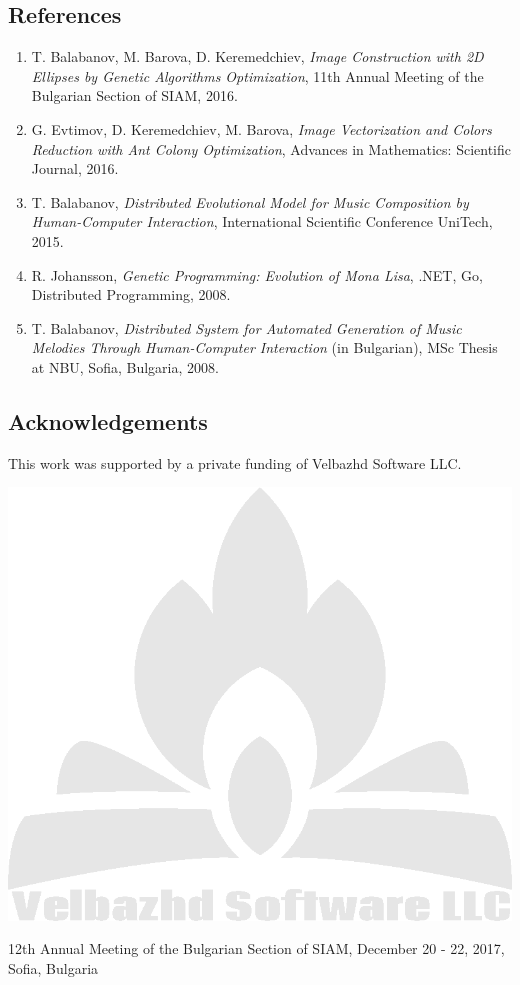 \documentclass[a0,portrait,25pt]{sciposter}
\begin{document}
\begin{multicols}{3}
\begin{mdframed}[backgroundcolor=white,roundcorner=4pt,shadow=true,linewidth=1pt]
\section*{References}
\begin{enumerate}
\item T. Balabanov, M. Barova, D. Keremedchiev, \textit{Image Construction with 2D Ellipses by Genetic Algorithms Optimization}, 11th Annual Meeting of the Bulgarian Section of SIAM, 2016.
\item G. Evtimov, D. Keremedchiev, M. Barova, \textit{Image Vectorization and Colors Reduction with Ant Colony Optimization}, Advances in Mathematics: Scientific Journal, 2016.
\item T. Balabanov, \textit{Distributed Evolutional Model for Music Composition by Human-Computer Interaction}, International Scientific Conference UniTech, 2015.
\item R. Johansson, \textit{Genetic Programming: Evolution of Mona Lisa}, .NET, Go, Distributed Programming, 2008.
\item T. Balabanov, \textit{Distributed System for Automated Generation of Music Melodies Through Human-Computer Interaction} (in Bulgarian), MSc Thesis at NBU, Sofia, Bulgaria, 2008.
\end{enumerate}
\end{mdframed}

\begin{mdframed}[backgroundcolor=white,roundcorner=4pt,shadow=true,linewidth=1pt]
\section*{Acknowledgements}
This work was supported by a private funding of Velbazhd Software LLC. 

\includegraphics[width=1.0\linewidth]{veld_soft_camp_fire_logo}
\end{mdframed}
\end{multicols}

\begin{mdframed}[backgroundcolor=white,roundcorner=4pt,shadow=true,linewidth=1pt]
\color{Black}
12th Annual Meeting of the Bulgarian Section of SIAM, December 20 - 22, 2017, Sofia, Bulgaria
\end{mdframed}
\end{document}
